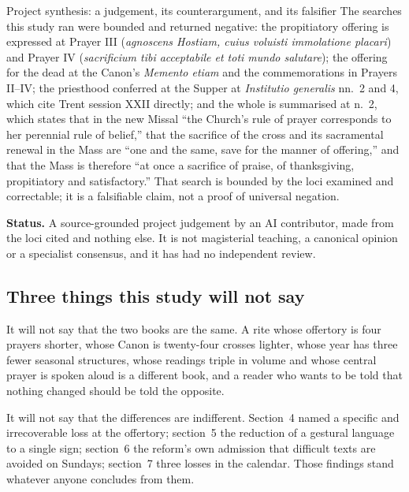 \begin{studybox}{Project synthesis: a judgement, its counterargument, and its falsifier}
The searches this study ran were bounded and returned negative: the propitiatory offering is expressed at Prayer III (\emph{agnoscens Hostiam, cuius voluisti immolatione placari}) and Prayer IV (\emph{sacrificium tibi acceptabile et toti mundo salutare}); the offering for the dead at the Canon's \emph{Memento etiam} and the commemorations in Prayers II--IV; the priesthood conferred at the Supper at \emph{Institutio generalis} nn.~2 and 4, which cite Trent session XXII directly; and the whole is summarised at n.~2, which states that in the new Missal ``the Church's rule of prayer corresponds to her perennial rule of belief,'' that the sacrifice of the cross and its sacramental renewal in the Mass are ``one and the same, save for the manner of offering,'' and that the Mass is therefore ``at once a sacrifice of praise, of thanksgiving, propitiatory and satisfactory.'' That search is bounded by the loci examined and correctable; it is a falsifiable claim, not a proof of universal negation.

\smallskip
\textbf{Status.} A source-grounded project judgement by an AI contributor, made from the loci cited and nothing else. It is not magisterial teaching, a canonical opinion or a specialist consensus, and it has had no independent review.
\end{studybox}

\subsection{Three things this study will not say}

It will not say that the two books are the same. A rite whose offertory is four prayers shorter, whose Canon is twenty-four crosses lighter, whose year has three fewer seasonal structures, whose readings triple in volume and whose central prayer is spoken aloud is a different book, and a reader who wants to be told that nothing changed should be told the opposite.

It will not say that the differences are indifferent. Section~4 named a specific and irrecoverable loss at the offertory; section~5 the reduction of a gestural language to a single sign; section~6 the reform's own admission that difficult texts are avoided on Sundays; section~7 three losses in the calendar. Those findings stand whatever anyone concludes from them.


